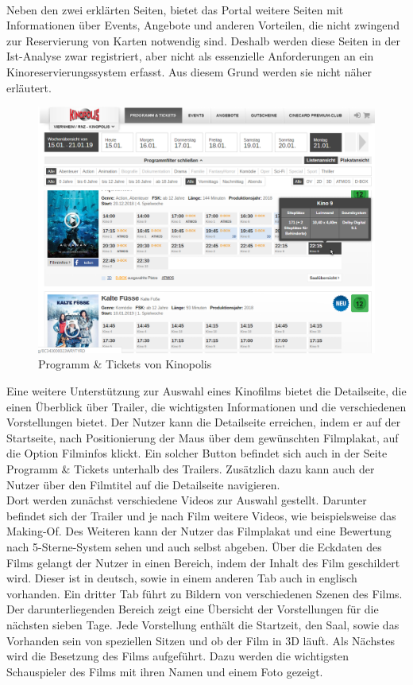 	\\Neben den zwei erklärten Seiten, bietet das Portal weitere Seiten mit Informationen über Events, Angebote und anderen Vorteilen, die nicht zwingend zur Reservierung von Karten notwendig sind. Deshalb werden diese Seiten in der Ist-Analyse zwar registriert, aber nicht als essenzielle Anforderungen an ein Kinoreservierungssystem erfasst. Aus diesem Grund werden sie nicht näher erläutert.
	\begin{figure}
		\centering 
		\includegraphics[scale=0.45]{img/Kinopolis_Programm_Tickets.png}
		\captionsetup{format=hang}
		\centering\caption[Startseite von Kinopolis Viernheim]{\label{fig:Kinop.Progr.}Programm \& Tickets von Kinopolis\footnotemark}
	\end{figure}
	
	Eine weitere Unterstützung zur Auswahl eines Kinofilms bietet die Detailseite, die einen Überblick über Trailer, die wichtigsten Informationen und die verschiedenen Vorstellungen bietet. Der Nutzer kann die  Detailseite erreichen, indem er auf der Startseite, nach Positionierung der Maus über dem gewünschten Filmplakat, auf die Option Filminfos klickt. Ein solcher Button befindet sich auch in der Seite Programm \& Tickets unterhalb des Trailers. Zusätzlich dazu kann auch der Nutzer über den Filmtitel auf die Detailseite navigieren. 
	\\Dort werden zunächst verschiedene Videos zur Auswahl gestellt. Darunter befindet sich der Trailer und je nach Film weitere Videos, wie beispielsweise das Making-Of. Des Weiteren kann der Nutzer das Filmplakat und eine Bewertung nach 5-Sterne-System sehen und auch selbst abgeben. Über die Eckdaten des Films gelangt der Nutzer in einen Bereich, indem der Inhalt des Film geschildert wird. Dieser ist in deutsch, sowie in einem anderen Tab auch in englisch vorhanden. Ein dritter Tab führt zu Bildern von verschiedenen Szenen des Films. Der darunterliegenden Bereich zeigt eine Übersicht der Vorstellungen für die nächsten sieben Tage. Jede Vorstellung enthält die Startzeit, den Saal, sowie das Vorhanden sein von speziellen Sitzen und ob der Film in 3D läuft. Als Nächstes wird die Besetzung des Films aufgeführt. Dazu werden die wichtigsten Schauspieler des Films mit ihren Namen und einem Foto gezeigt.  
	

